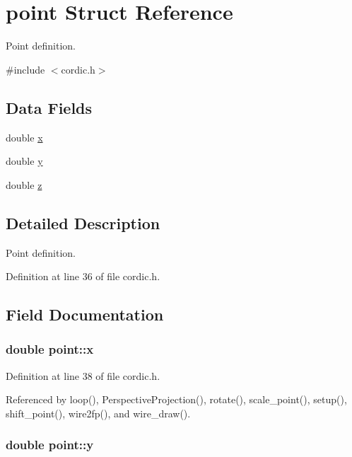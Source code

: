 \hypertarget{structpoint}{}\section{point Struct Reference}
\label{structpoint}


Point definition.  




{\ttfamily \#include $<$cordic.\+h$>$}

\subsection*{Data Fields}
\begin{DoxyCompactItemize}
\item 
double \hyperlink{structpoint_a9c6b34deaf4900ad4193c17935fd384a}{x}
\item 
double \hyperlink{structpoint_a613f8f0d7352731638b0094e1b958b87}{y}
\item 
double \hyperlink{structpoint_aab1f0c3682401083b5bf252e7001874f}{z}
\end{DoxyCompactItemize}


\subsection{Detailed Description}
Point definition. 

Definition at line 36 of file cordic.\+h.



\subsection{Field Documentation}
\subsubsection[{\texorpdfstring{x}{x}}]{\setlength{\rightskip}{0pt plus 5cm}double point\+::x}\hypertarget{structpoint_a9c6b34deaf4900ad4193c17935fd384a}{}\label{structpoint_a9c6b34deaf4900ad4193c17935fd384a}


Definition at line 38 of file cordic.\+h.



Referenced by loop(), Perspective\+Projection(), rotate(), scale\+\_\+point(), setup(), shift\+\_\+point(), wire2fp(), and wire\+\_\+draw().

\subsubsection[{\texorpdfstring{y}{y}}]{\setlength{\rightskip}{0pt plus 5cm}double point\+::y}\hypertarget{structpoint_a613f8f0d7352731638b0094e1b958b87}{}\label{structpoint_a613f8f0d7352731638b0094e1b958b87}


